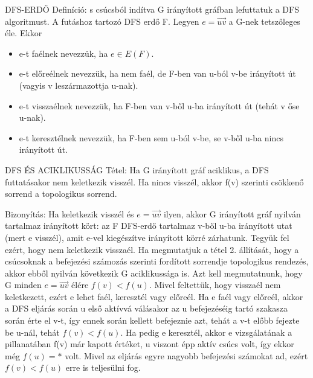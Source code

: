 \documentclass[]{article}
\begin{document}
\begin{shaded}
DFS-ERDŐ Definíció: s csúcsból indítva G irányított gráfban lefuttatuk a DFS algoritmust. A futáshoz tartozó DFS erdő F. Legyen $e=\overrightarrow{uv}$ a G-nek tetszőleges éle. Ekkor
\begin{itemize}
\item e-t faélnek nevezzük, ha $e \in E(F)$.
\item e-t előreélnek nevezzük, ha nem faél, de F-ben van u-ból v-be irányított út (vagyis v leszármazottja u-nak).
\item e-t visszaélnek nevezzük, ha F-ben van v-ből u-ba irányított út (tehát v őse u-nak).
\item e-t keresztélnek nevezzük, ha F-ben sem u-ból v-be, se v-ből u-ba nincs irányított út.
\end{itemize}
\end{shaded}
\begin{framed}
DFS ÉS ACIKLIKUSSÁG Tétel: Ha G irányított gráf aciklikus, a DFS futtatásakor nem keletkezik visszél. Ha nincs visszél, akkor f(v) szerinti csökkenő sorrend a topologikus sorrend.
\end{framed}
\begin{leftbar}
Bizonyítás: Ha keletkezik visszél és $e = \overrightarrow{uv}$ ilyen, akkor G irányított gráf nyilván tartalmaz irányított kört: az F DFS-erdő tartalmaz v-ből u-ba irányított utat (mert e visszél), amit e-vel kiegészítve irányított körré zárhatunk. Tegyük fel ezért, hogy nem keletkezik visszaél. Ha megmutatjuk a tétel 2. állítását, hogy a csúcsoknak a befejezési számozás szerinti fordított sorrendje topologikus rendezés, akkor ebből nyilván következik G aciklikussága is. Azt kell megmutatnunk, hogy G minden $e = \overrightarrow{uv}$ élére $f(v) < f(u)$. Mivel feltettük, hogy visszaél nem keletkezett, ezért e lehet faél, keresztél vagy előreél. Ha e faél vagy előreél, akkor a DFS eljárás során u első aktívvá válásakor az u befejezéséig tartó szakasza során érte el v-t, így ennek során kellett befejeznie azt, tehát a v-t előbb fejezte be u-nál, tehát $f(v) < f(u)$. Ha pedig e keresztél, akkor e vizsgálatának a pillanatában f(v) már kapott értéket, u viszont épp aktív csúcs volt, így ekkor még $f(u) = *$ volt. Mivel az eljárás egyre nagyobb befejezési számokat ad, ezért $f(v) < f(u)$ erre is teljesülni fog.
\end{leftbar}
\end{document}
